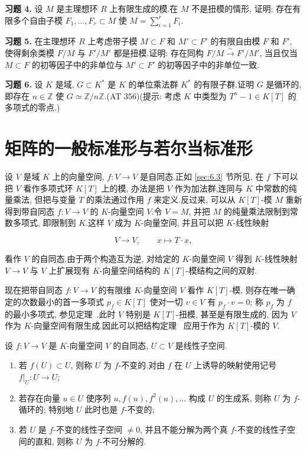 \medskip
\noindent\textbf{习题 4.} 设 $M$ 是主理想环 $R$ 上有限生成的模.在 $M$ 不是扭模的情形, 证明: 存在有限多个自由子模 $F_1, \ldots, F_r \subset M$ 使 $M = \sum_{i = 1}^{r} F_i$.

\medskip
\noindent\textbf{习题 5.} 在主理想环 $R$ 上考虑带子模 $M \subset F$ 和 $M' \subset F'$ 的有限自由模 $F$ 和 $F'$, 使得剩余类模 $F/M$ 与 $F'/M'$ 都是扭模.证明: 存在同构 $F/M \xrightarrow{\sim} F'/M'$, 当且仅当 $M \subset F$ 的初等因子中的非单位与 $M' \subset F'$ 的初等因子中的非单位一致.

\medskip
\noindent\textbf{习题 6.} 设 $K$ 是域, $G \subset K^*$ 是 $K$ 的单位乘法群 $K^*$ 的有限子群.证明 $G$ 是循环的, 即存在 $n \in \mathbb{Z}$ 使 $G \simeq \mathbb{Z}/n\mathbb{Z}$.(AT 356)(提示: 考虑 $K$ 中类型为 $T^n - 1 \in K[T]$ 的多项式的零点.)


\section{矩阵的一般标准形与若尔当标准形}\label{sec:6.5}

设 $V$ 是域 $K$ 上的向量空间, $f \colon V \longrightarrow V$ 是自同态.正如 \ref{sec:6.3} 节所见, 在 $f$ 下可以把 $V$ 看作多项式环 $K[T]$ 上的模, 办法是把 $V$ 作为加法群,连同与 $K$ 中常数的纯量乘法, 但把与变量 $T$ 的乘法通过作用 $f$ 来定义.反过来, 可以从 $K[T]$-模 $M$ 重新得到带自同态 $f \colon V \longrightarrow V$ 的 $K$-向量空间 $V$.令 $V = M$, 并把 $M$ 的纯量乘法限制到常数多项式, 即限制到 $K$.这样 $V$ 成为 $K$-向量空间, 并且可以把 $K$-线性映射

\[
V \longrightarrow V, \qquad x \longmapsto T \cdot x,\]

看作 $V$ 的自同态.由于两个构造互为逆, 对给定的 $K$-向量空间 $V$ 得到 $K$-线性映射 $V \longrightarrow V$ 与 $V$ 上扩展现有 $K$-向量空间结构的 $K[T]$-模结构之间的双射.

现在把带自同态 $f \colon V \longrightarrow V$ 的有限维 $K$-向量空间 $V$ 看作 $K[T]$-模, 则存在唯一确定的次数最小的首一多项式 $p_f \in K[T]$ 使对一切 $v \in V$ 有 $p_f \cdot v = 0$; 称 $p_f$ 为 $f$ 的最小多项式, 参见定理~.此时 $V$ 特别是 $K[T]$-扭模, 甚至是有限生成的, 因为 $V$ 作为 $K$-向量空间有限生成.因此可以把结构定理~ 应用于作为 $K[T]$-模的 $V$.

\begin{definition}\label{def:6.5.1}
设 $f \colon V \longrightarrow V$ 是 $K$-向量空间 $V$ 的自同态, $U \subset V$ 是线性子空间.
\begin{enumerate}
\item[(i)] 若 $f(U) \subset U$, 则称 $U$ 为 $f$-不变的.对由 $f$ 在 $U$ 上诱导的映射使用记号 $f|_U \colon U \longrightarrow U$;
\item[(ii)] 若存在向量 $u \in U$ 使序列 $u, f(u), f^2(u), \ldots$ 构成 $U$ 的生成系, 则称 $U$ 为 $f$-循环的; 特别地 $U$ 此时也是 $f$-不变的;
\item[(iii)] 若 $U$ 是 $f$-不变的线性子空间 $\neq 0$, 并且不能分解为两个真 $f$-不变的线性子空间的直和, 则称 $U$ 为 $f$-不可分解的.
\end{enumerate}
\end{definition}

